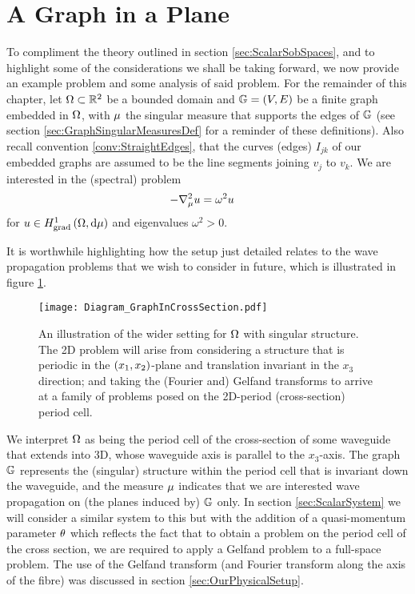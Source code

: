 \section{A Graph in a Plane} \label{sec:ScalarExample}
To compliment the theory outlined in section \ref{sec:ScalarSobSpaces}, and to highlight some of the considerations we shall be taking forward, we now provide an example problem and some analysis of said problem.
For the remainder of this chapter, let $\Omega\subset\mathbb{R}^2$ be a bounded domain and $\mathbb{G} = \left( V,E \right)$ be a finite graph embedded in $\Omega$, with $\mu$ the singular measure that supports the edges of $\mathbb{G}$ (see section \ref{sec:GraphSingularMeasuresDef} for a reminder of these definitions).
Also recall convention \ref{conv:StraightEdges}, that the curves (edges) $I_{jk}$ of our embedded graphs are assumed to be the line segments joining $v_j$ to $v_k$.
We are interested in the (spectral) problem
\begin{align} \label{eq:ScalarExampleStrongForm}
	-\nabla_\mu^2 u &= \omega^2 u
\end{align}
for $u\in H^1_\mathrm{grad}\left( \Omega, \mathrm{d}\mu \right)$ and eigenvalues $\omega^2>0$. \newline

It is worthwhile highlighting how the setup just detailed relates to the wave propagation problems that we wish to consider in future, which is illustrated in figure \ref{fig:ScalarStrucDiagram}.
\begin{figure}[b!]
	\centering
	\texttt{[image: Diagram\_GraphInCrossSection.pdf]}
	\caption{\label{fig:ScalarStrucDiagram} An illustration of the wider setting for $\Omega$ with singular structure. The 2D problem will arise from considering a structure that is periodic in the $\left( x_1,x_2 \right)$-plane and translation invariant in the $x_3$ direction; and taking the (Fourier and) Gelfand transforms to arrive at a family of problems posed on the 2D-period (cross-section) period cell.}
\end{figure}
We interpret $\Omega$ as being the period cell of the cross-section of some waveguide that extends into 3D, whose waveguide axis is parallel to the $x_3$-axis.
The graph $\mathbb{G}$ represents the (singular) structure within the period cell that is invariant down the waveguide, and the measure $\mu$ indicates that we are interested wave propagation on (the planes induced by) $\mathbb{G}$ only.
In section \ref{sec:ScalarSystem} we will consider a similar system to this but with the addition of a quasi-momentum parameter $\theta$ which reflects the fact that to obtain a problem on the period cell of the cross section, we are required to apply a Gelfand problem to a full-space problem.
The use of the Gelfand transform (and Fourier transform along the axis of the fibre) was discussed in section \ref{sec:OurPhysicalSetup}. \newline

